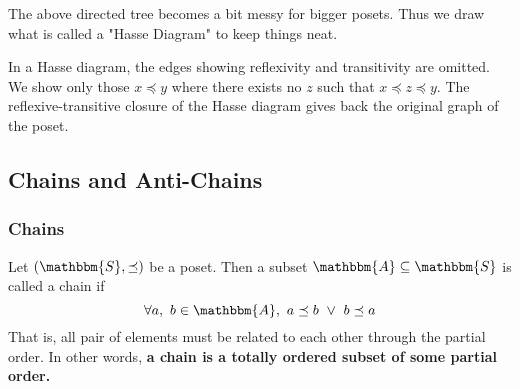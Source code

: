 \documentclass[14pt]{extarticle}
\newcommand{\A}{\mathbbm{A}}
\newcommand{\Sset}{\mathbbm{S}}
\newcommand{\pordereq}{\preceq}
\begin{document}
The above directed tree becomes a bit messy for bigger posets. Thus we draw what is called a "Hasse Diagram" to keep things neat.

\begin{center}
\end{center}

In a Hasse diagram, the edges showing reflexivity and transitivity are omitted. We show only those $x \pordereq y$ where there exists no $z$ such that $x \pordereq z \pordereq y$. The reflexive-transitive closure of the Hasse diagram gives back the original graph of the poset.

\subsection{Chains and Anti-Chains}

\subsubsection{Chains}

Let $(\Sset, \pordereq)$ be a poset. Then a subset $\A \subseteq \Sset$ is called a chain if
\[
    \forall a, \ b \in \A, \ a \pordereq b \ \lor \ b \pordereq a
\]
That is, all pair of elements must be related to each other through the partial order. In other words, \textbf{a chain is a totally ordered subset of some partial order.}
\end{document}
